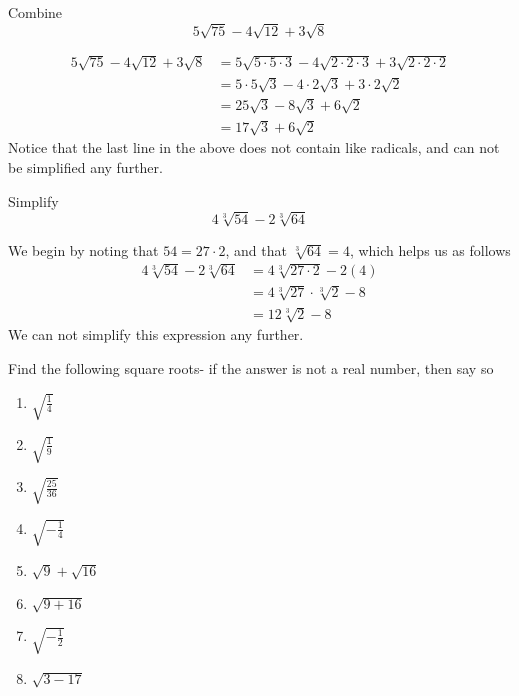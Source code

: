 \begin{myexample}
Combine
\[
	5\sqrt{75}-4\sqrt{12}+3\sqrt{8}
\]
\end{myexample}
\begin{myProof}
	\begin{align*}
		5\sqrt{75}-4\sqrt{12}+3\sqrt{8} & =  5\sqrt{5\cdot 5\cdot 3 }	-4\sqrt{2\cdot 2 \cdot 3  }+3\sqrt{2\cdot 2 \cdot 2} \\  
		                                & =  5\cdot 5\sqrt{3}-4\cdot 2\sqrt{3} + 3\cdot 2\sqrt{2}                          \\
		                                & =  25\sqrt{3} - 8 \sqrt{3} + 6\sqrt{2}                                           \\	
		                                & =  17\sqrt{3}+6\sqrt{2}                                                          
	\end{align*} 
	Notice that the last line in the above does not contain like radicals, and can not be simplified any further.
\end{myProof} 

\begin{myexample}
Simplify
\[
	4\sqrt[3]{54} - 2\sqrt[3]{64}
\]
\end{myexample}
\begin{myProof}
	We begin by noting that $54=27\cdot 2$, and that $\sqrt[3]{64}=4$, which helps
	us as follows
	\begin{align*}
		4\sqrt[3]{54} - 2\sqrt[3]{64} & =  4\sqrt[3]{27 \cdot 2} - 2(4)       \\
		                              & =  4\sqrt[3]{27}\cdot \sqrt[3]{2} - 8 \\
		                              & =  12 \sqrt[3]{2}-8                   
	\end{align*}
	We can not simplify this expression any further.
\end{myProof}

\begin{myexample}
Find the following square roots- if the answer is not a real number, then say so
\drillandskill
\end{myexample}
\begin{multicols}{2}
	\begin{enumerate}
		\item $\sqrt{\frac{1}{4}}$ 
		\item $\sqrt{\frac{1}{9}}$ 
		\item $\sqrt{\frac{25}{36}}$ 
		\item $\sqrt{-\frac{1}{4}}$ 
		\item $\sqrt{9}+\sqrt{16}$ 
		\item $\sqrt{9+16}$ 
		\item $\sqrt{-\frac{1}{2}}$ 
		\item $\sqrt{3-17}$ 
	\end{enumerate}
\end{multicols}

